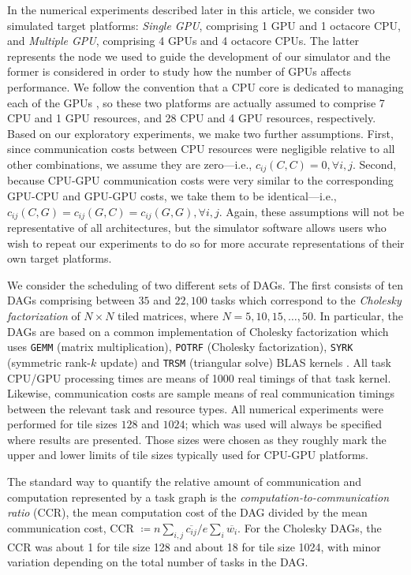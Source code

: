 \documentclass[runningheads]{llncs}
\begin{document}
In the numerical experiments described later in this article, we consider two simulated target platforms: {\em Single GPU}, comprising 1 GPU and 1 octacore CPU, and {\em Multiple GPU}, comprising 4 GPUs and 4 octacore CPUs. The latter represents the node we used to guide the development of our simulator and the former is considered in order to study how the number of GPUs affects performance. We follow the convention that a CPU core is dedicated to managing each of the GPUs \cite{augonnet2011starpu}, so these two platforms are actually assumed to comprise 7 CPU and 1 GPU resources, and 28 CPU and 4 GPU resources, respectively. Based on our exploratory experiments, we make two further assumptions. First, since communication costs between CPU resources were negligible relative to all other combinations, we assume they are zero---i.e., $c_{ij}(C, C) = 0, \forall i, j$. Second, because CPU-GPU communication costs were very similar to the corresponding GPU-CPU and GPU-GPU costs, we take them to be identical---i.e., $c_{ij}(C, G) = c_{ij}(G, C) = c_{ij}(G, G), \forall i, j$. Again, these assumptions will not be representative of all architectures, but the simulator software allows users who wish to repeat our experiments to do so for more accurate representations of their own target platforms. 

We consider the scheduling of two different sets of DAGs. The first consists of ten DAGs comprising between $35$ and $22,100$ tasks which correspond to the {\em Cholesky factorization} of $N \times N$ tiled matrices, where $N = 5, 10, 15, \dots, 50$. In particular, the DAGs are based on a common implementation of Cholesky factorization which uses {\tt GEMM} (matrix multiplication), {\tt POTRF} (Cholesky factorization), {\tt SYRK} (symmetric rank-$k$ update) and {\tt TRSM} (triangular solve) BLAS kernels \cite{Dongarra:1990:SLB:77626.79170}. All task CPU/GPU processing times are means of 1000 real timings of that task kernel. Likewise, communication costs are sample means of real communication timings between the relevant task and resource types. All numerical experiments were performed for tile sizes $128$ and $1024$; which was used will always be specified where results are presented. Those sizes were chosen as they roughly mark the upper and lower limits of tile sizes typically used for CPU-GPU platforms.

The standard way to quantify the relative amount of communication and computation represented by a task graph is the {\em computation-to-communication ratio} (CCR), the mean computation cost of the DAG divided by the mean communication cost, CCR $\coloneqq n \sum_{i, j}\overline{c_{ij}}  / e\sum_{i} \overline{w_i}$. For the Cholesky DAGs, the CCR was about 1 for tile size 128 and about 18 for tile size 1024, with minor variation depending on the total number of tasks in the DAG. 
\end{document}
